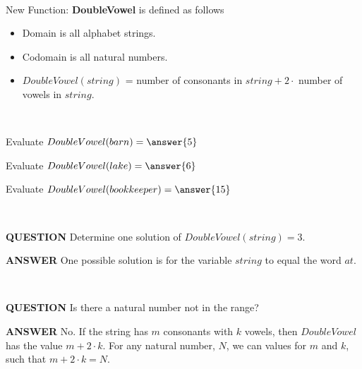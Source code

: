 \documentclass{ximera}
\begin{document}
\begin{exploration}
\quad \\
New Function: \textbf{DoubleVowel} is defined as follows \\
\begin{itemize}
\item Domain is all alphabet strings.
\item Codomain is all natural numbers.
\item $DoubleVowel(string)$ = number of consonants in $string + 2 \cdot$ number of vowels in $string$.
\end{itemize}

\quad \\




\begin{question}
Evaluate  $DoubleVowel(barn) = \answer{5}$
\end{question}


\begin{question}
Evaluate  $DoubleVowel(lake) = \answer{6}$
\end{question}


\begin{question}
Evaluate  $DoubleVowel(bookkeeper) = \answer{15}$
\end{question}
\quad \\


\begin{dialogue}
\item[\textbf{QUESTION}] Determine one solution of $DoubleVowel(string) = 3$.
\item[\textbf{ANSWER}] One possible solution is for the variable $string$ to equal the word $at$.
\end{dialogue}

\quad \\

\begin{dialogue}
\item[\textbf{QUESTION}] Is there a natural number not in the range?
\item[\textbf{ANSWER}] No. If the string has $m$ consonants with $k$ vowels, then $DoubleVowel$ has the value $m + 2 \cdot k$. 
For any natural number, $N$, we can values for $m$ and $k$, such that $m + 2 \cdot k = N$.
\end{dialogue}







\end{exploration}
\end{document}
